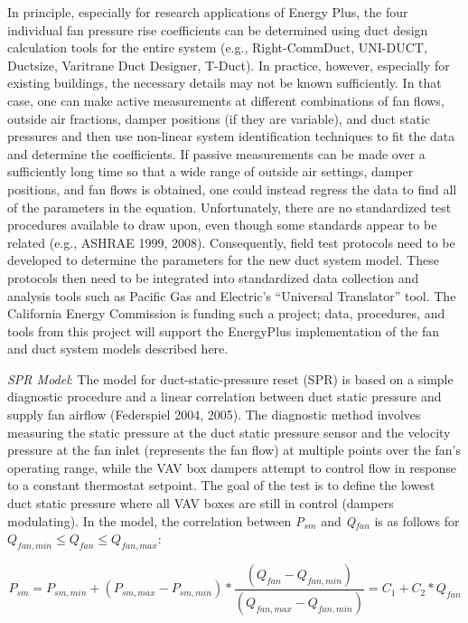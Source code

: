 In principle, especially for research applications of Energy Plus, the four individual fan pressure rise coefficients can be determined using duct design calculation tools for the entire system (e.g., Right-CommDuct, UNI-DUCT, Ductsize, Varitrane Duct Designer, T-Duct). In practice, however, especially for existing buildings, the necessary details may not be known sufficiently. In that case, one can make active measurements at different combinations of fan flows, outside air fractions, damper positions (if they are variable), and duct static pressures and then use non-linear system identification techniques to fit the data and determine the coefficients. If passive measurements can be made over a sufficiently long time so that a wide range of outside air settings, damper positions, and fan flows is obtained, one could instead regress the data to find all of the parameters in the equation. Unfortunately, there are no standardized test procedures available to draw upon, even though some standards appear to be related (e.g., ASHRAE 1999, 2008). Consequently, field test protocols need to be developed to determine the parameters for the new duct system model. These protocols then need to be integrated into standardized data collection and analysis tools such as Pacific Gas and Electric's ``Universal Translator'' tool. The California Energy Commission is funding such a project; data, procedures, and tools from this project will support the EnergyPlus implementation of the fan and duct system models described here.

\emph{SPR Model}: The model for duct-static-pressure reset (SPR) is based on a simple diagnostic procedure and a linear correlation between duct static pressure and supply fan airflow (Federspiel 2004, 2005). The diagnostic method involves measuring the static pressure at the duct static pressure sensor and the velocity pressure at the fan inlet (represents the fan flow) at multiple points over the fan's operating range, while the VAV box dampers attempt to control flow in response to a constant thermostat setpoint. The goal of the test is to define the lowest duct static pressure where all VAV boxes are still in control (dampers modulating). In the model, the correlation between \emph{P\(_{sm}\)} and \emph{Q\(_{fan}\)} is as follows for \({Q_{fan,min}} \leq {Q_{fan}} \leq {Q_{fan,max}}\):

\begin{equation}
{P_{sm}} = {P_{sm,min }} + \left( {{P_{sm,max }} - {P_{sm,min }}} \right)*\frac{{\left( {{Q_{fan}} - {Q_{fan,min }}} \right)}}{{\left( {{Q_{fan,max }} - {Q_{fan,min }}} \right)}} = {C_1} + {C_2}*{Q_{fan}}
\label{eq:Psm533}
\end{equation}

